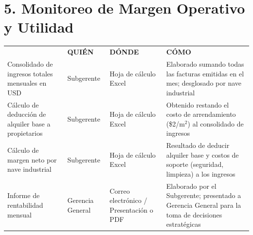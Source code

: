 \documentclass[11pt,letterpaper]{report}
\begin{document}
\section*{5. Monitoreo de Margen Operativo y Utilidad}
\begin{tabularx}{\textwidth}{>{\raggedright\arraybackslash}X >{\raggedright\arraybackslash}p{} >{\raggedright\arraybackslash}p{} >{\raggedright\arraybackslash}X}
\toprule
\multirow{2}{*}{\textbf{DOCUMENTO (QUÉ)}} & \multicolumn{3}{c}{\textbf{CUSTODIA}} \\
\cmidrule{2-4}
& \textbf{QUIÉN} & \textbf{DÓNDE} & \textbf{CÓMO} \\
\midrule
Consolidado de ingresos totales mensuales en USD & Subgerente & Hoja de cálculo Excel & Elaborado sumando todas las facturas emitidas en el mes; desglosado por nave industrial \\
\midrule
Cálculo de deducción de alquiler base a propietarios & Subgerente & Hoja de cálculo Excel & Obtenido restando el costo de arrendamiento (\$2/m$^2$) al consolidado de ingresos \\
\midrule
Cálculo de margen neto por nave industrial & Subgerente & Hoja de cálculo Excel & Resultado de deducir alquiler base y costos de soporte (seguridad, limpieza) a los ingresos \\
\midrule
Informe de rentabilidad mensual & Gerencia General & Correo electrónico / Presentación o PDF & Elaborado por el Subgerente; presentado a Gerencia General para la toma de decisiones estratégicas \\
\bottomrule
\end{tabularx}

\vspace{2em}

\end{document}

